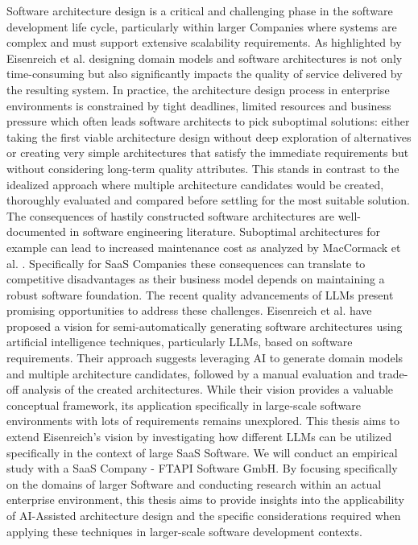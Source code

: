 \documentclass[12pt,a4paper]{article}
\begin{document}
Software architecture design is a critical and challenging phase in the software development life cycle, particularly within larger Companies where systems are complex and must support extensive scalability requirements. As highlighted by Eisenreich et al. \autocite{eisenreich2024} designing domain models and software architectures is not only time-consuming but also significantly impacts the quality of service delivered by the resulting system. \newline In practice, the architecture design process in enterprise environments is constrained by tight deadlines, limited resources and business pressure which often leads software architects to pick suboptimal solutions: either taking the first viable architecture design without deep exploration of alternatives or creating very simple architectures that satisfy the immediate requirements but without considering long-term quality attributes. This stands in contrast to the idealized approach where multiple architecture candidates would be created, thoroughly evaluated and compared before settling for the most suitable solution. \newline The consequences of hastily constructed software architectures are well-documented in software engineering literature. Suboptimal architectures for example can lead to increased maintenance cost as analyzed by MacCormack et al. \autocite{MACCORMACK2016170}. Specifically for SaaS Companies these consequences can translate to competitive disadvantages as their business model depends on maintaining a robust software foundation. \newline The recent quality advancements of LLMs present promising opportunities to address these challenges. Eisenreich et al. \cite{eisenreich2024} have proposed a vision for semi-automatically generating software architectures using artificial intelligence techniques, particularly LLMs, based on software requirements. Their approach suggests leveraging AI to generate domain models and multiple architecture candidates, followed by a manual evaluation and trade-off analysis of the created architectures. \newline While their vision provides a valuable conceptual framework, its application specifically in large-scale software environments with lots of requirements remains unexplored. \newline
This thesis aims to extend Eisenreich's vision by investigating how different LLMs can be utilized specifically in the context of large SaaS Software. We will conduct an empirical study with a SaaS Company - FTAPI Software GmbH. By focusing specifically on the domains of larger Software and conducting research within an actual enterprise environment, this thesis aims to provide insights into the applicability of AI-Assisted architecture design and the specific considerations required when applying these techniques in larger-scale software development contexts.
\end{document}
